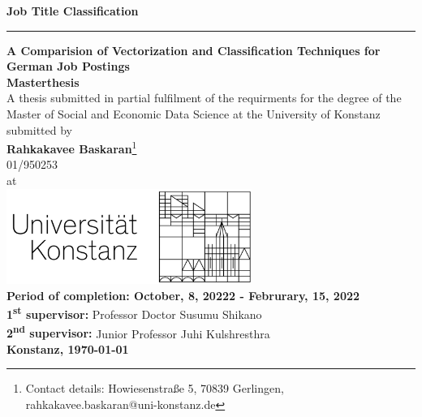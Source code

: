 \documentclass[12pt, a4paper, titlepage]{article}
\begin{document}
\begin{titlepage}
    \begin{center}
    {\LARGE \textbf{Job Title Classification}}
    \noindent\rule[0.5ex]{\linewidth}{1pt}
    {\Large \textbf{A Comparision of Vectorization and Classification Techniques for German Job Postings}}
    \\[1cm]
    {\Large \textbf{Masterthesis}}
    \\[1cm]
    {\normalsize A thesis submitted in partial fulfilment of the requirments for the degree of the Master of Social and Economic Data Science at the University of Konstanz}
    \\[1cm]
    {\Large submitted by}
    \\[0.5cm]
    \renewcommand*{\thefootnote}{\fnsymbol{footnote}}
    {\Large \textbf{Rahkakavee Baskaran}\footnote{Contact details: Howiesenstraße 5, 70839 Gerlingen, rahkakavee.baskaran@uni-konstanz.de}}
    \\[0.5cm]
    {\Large 01/950253}
    \\[0.5cm]
    {\Large at}
    \\[1cm]
    \includegraphics[width=0.6\textwidth]{logo.jpg}
    \\[1cm]
    {\normalsize \textbf{Period of completion: October, 8, 20222 - Februrary, 15, 2022}} 
    \\[0.2cm]
  {\normalsize \textbf{1\textsuperscript{st} supervisor:} Professor Doctor Susumu Shikano}
  \\[0.1cm]
  {\normalsize \textbf{2\textsuperscript{nd} supervisor:} Junior Professor Juhi Kulshresthra}
  \\[1cm]
    {\Large \textbf{Konstanz, \today}}
  \end{center}
    \end{titlepage}

\tableofcontents
\newpage
\listoffigures
\newpage
\listoftables
\newpage
\end{document}
